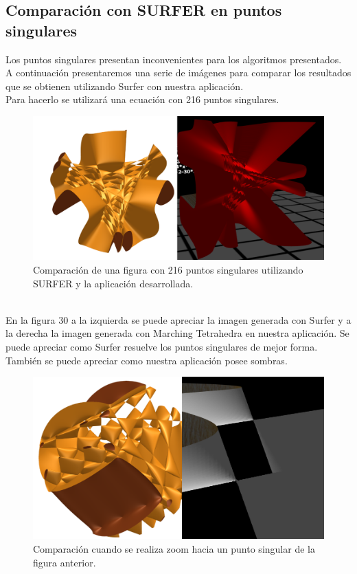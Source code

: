 \documentclass[12pt]{article}
\begin{document}
\subsection{Comparación con SURFER en puntos singulares}
Los puntos singulares presentan inconvenientes para los algoritmos presentados. A continuación presentaremos una serie de imágenes para comparar los resultados que se obtienen utilizando Surfer con nuestra aplicación. 
\\Para hacerlo se utilizará una ecuación con 216 puntos singulares.\\
\begin{figure}[h!]
\includegraphics[width=\linewidth]{comp1.png}
\caption{Comparación de una figura con 216 puntos singulares utilizando SURFER y la aplicación desarrollada.}
\end{figure}
\\En la figura 30 a la izquierda se puede apreciar la imagen generada con Surfer y a la derecha la imagen generada con Marching Tetrahedra en nuestra aplicación. Se puede apreciar como Surfer resuelve los puntos singulares de mejor forma. También se puede apreciar como nuestra aplicación posee sombras.
\begin{figure}[h!]
\includegraphics[width=\linewidth]{comp2.png}
\caption{Comparación cuando se realiza zoom hacia un punto singular de la figura anterior.}
\end{figure}
\end{document}
